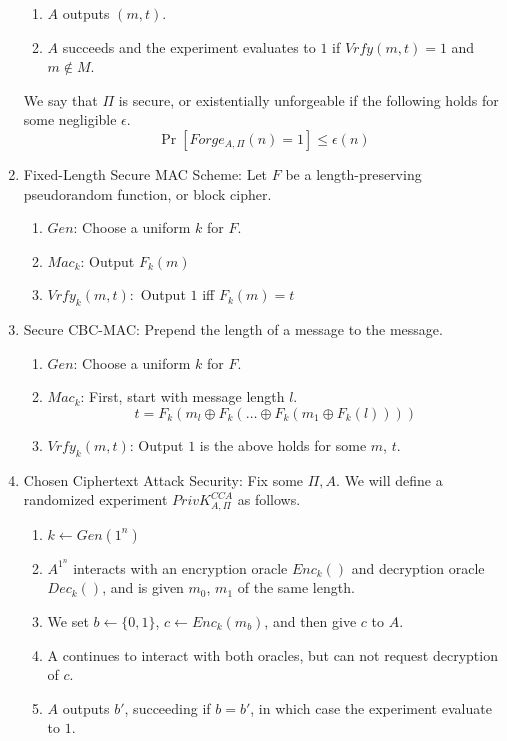 \documentclass[12pt,letterpaper]{article}
\begin{document}
\begin{enumerate}
\begin{enumerate}
                \item $A$ outputs $(m,t)$.
                \item $A$ succeeds and the experiment evaluates to $1$ if $Vrfy(m,t)=1$ and $m\not\in M$.
            \end{enumerate}
            We say that $\Pi$ is secure, or existentially unforgeable if the following holds for some negligible $\epsilon$.
            \[\Pr[Forge_{A,\Pi}(n)=1]\leq\epsilon (n)\]
        \item Fixed-Length Secure MAC Scheme: Let $F$ be a length-preserving pseudorandom function, or block cipher.
            \begin{enumerate}
                \item $Gen$: Choose a uniform $k$ for $F$.
                \item $Mac_k$: Output $F_k(m)$
                \item $Vrfy_{k}(m,t):$ Output $1$ iff $F_k(m)=t$
            \end{enumerate}
        \item Secure CBC-MAC: Prepend the length of a message to the message.
            \begin{enumerate}
                \item $Gen$: Choose a uniform $k$ for $F$.
                \item $Mac_k$: First, start with message length $l$. 
                    \[t=F_k(m_l\oplus F_k(\ldots\oplus F_k(m_1\oplus F_k(l))))\]
                \item $Vrfy_k(m,t)$: Output $1$ is the above holds for some $m$, $t$.
            \end{enumerate}\newpage
        \item Chosen Ciphertext Attack Security: Fix some $\Pi, A$. We will define a randomized experiment $PrivK^{CCA}_{A,\Pi}$ as follows.
        \begin{enumerate}
            \item $k\leftarrow Gen(1^n)$
            \item $A^{1^n}$ interacts with an encryption oracle $Enc_k()$ and decryption oracle $Dec_k()$, and is given $m_0$, $m_1$ of the same length. 
            \item We set $b\leftarrow\{0,1\}$, $c\leftarrow Enc_k(m_b)$, and then give $c$ to $A$.
            \item A continues to interact with both oracles, but can not request decryption of $c$.
            \item $A$ outputs $b'$, succeeding if $b=b'$, in which case the experiment evaluate to $1$.

\end{enumerate}
\end{enumerate}
\end{document}
